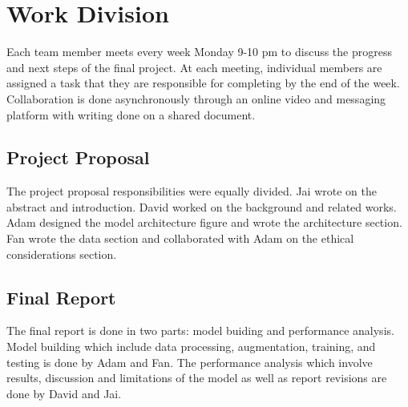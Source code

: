 \documentclass[../main.tex]{subfiles}
\begin{document}
\section{Work Division} 
Each team member meets every week Monday 9-10 pm to 
discuss the progress and next steps of the final project. At each meeting, 
individual members are assigned a task that they are responsible for completing 
by the end of the week. Collaboration is done asynchronously through an online 
video and messaging platform with writing done on a shared document.

\subsection{Project Proposal} 
The project proposal responsibilities were equally divided. Jai wrote on 
the abstract and introduction. David worked on the background and related works.
Adam designed the model architecture figure and wrote the architecture section. 
Fan wrote the data section and collaborated with Adam on the ethical 
considerations section.


\subsection{Final Report} 

The final report is done in two parts: model buiding and performance analysis. 
Model building which include data processing, augmentation, training, and testing
is done by Adam and Fan. 
The performance analysis which involve results, discussion and limitations of 
the model as well as report revisions are done by David and Jai.
\end{document}

